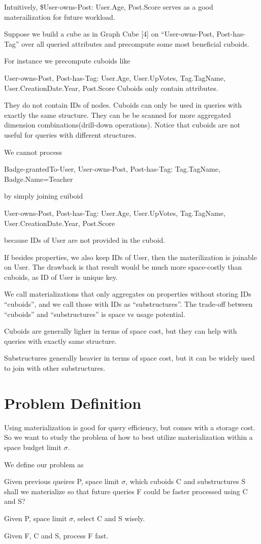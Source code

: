 Intuitively,  \$User-owns-Post: User.Age, Post.Score serves as a good materailization for future workload.

Suppose we build a cube as in Graph Cube [4] on “User-owns-Post, Post-has-Tag” over all queried attributes and precompute some most beneficial cuboids. 

For instance we precompute cuboids like

User-owns-Post, Post-has-Tag: User.Age, User.UpVotes, Tag.TagName, User.CreationDate.Year, Post.Score
Cuboids only contain attributes. 

They do not contain IDs of nodes. Cuboids can only be used in queries with exactly the same structure. They can be be scanned for more aggregated dimension combinations(drill-down operations). Notice that cuboids are not useful for queries with different structures.

We cannot process

Badge-grantedTo-User, User-owns-Post, Post-has-Tag: Tag.TagName, Badge.Name=Teacher

by simply  joining cuiboid

User-owns-Post, Post-has-Tag: User.Age, User.UpVotes, Tag.TagName, User.CreationDate.Year, Post.Score

because IDs of User are not provided in the cuboid.

If besides properties, we also keep IDs of User, then the materilization is joinable on User. The drawback is that result would be much more space-costly than cuboids, as ID of User is unique key. 

We call materializations that only aggregates on properties without storing IDs “cuboids”, and we call those with IDs as “substructures”. The trade-off between “cuboids” and “substructures” is space vs usage potential.

Cuboids are generally ligher in terms of space cost, but they can help with queries with exactly same structure.

Substructures generally heavier in terms of space cost, but it can be widely used to join with other substructures.




\section{Problem Definition}

Using materialization is good for query efficiency, but comes with a storage cost. So we want to study the problem of how to best utilize materialization within a space budget limit $\sigma$. 


We define our problem as

Given previous queires P, space limit $\sigma$, which cuboids C and substructures S shall we materialize so that future queries F could be faster processed using C and S? 

Given P, space limit $\sigma$, select C and S wisely.

Given F, C and S, process F fast.

